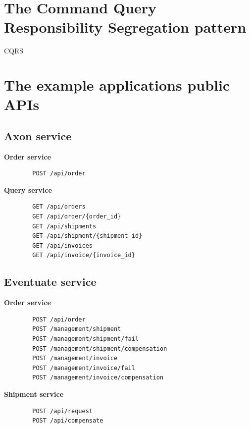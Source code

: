 \documentclass[oneside,
  digital, %
  table,   %
  nolof,     %
  nolot,     %
]{fithesis3}
\begin{document}



\appendix %

\chapter{The Command Query Responsibility Segregation pattern}

CQRS

\chapter{The example applications public APIs}

\section{Axon service}

\textbf{Order service}

\begin{verbatim}
        POST /api/order
\end{verbatim}

\noindent
\textbf{Query service}

\begin{verbatim}
        GET /api/orders
        GET /api/order/{order_id}
        GET /api/shipments
        GET /api/shipment/{shipment_id}
        GET /api/invoices
        GET /api/invoice/{invoice_id}
\end{verbatim}

\section{Eventuate service}

\textbf{Order service}

\begin{verbatim}
        POST /api/order
        POST /management/shipment
        POST /management/shipment/fail
        POST /management/shipment/compensation
        POST /management/invoice
        POST /management/invoice/fail
        POST /management/invoice/compensation
\end{verbatim}

\noindent
\textbf{Shipment service}

\begin{verbatim}
        POST /api/request
        POST /api/compensate
\end{verbatim}
\end{document}
